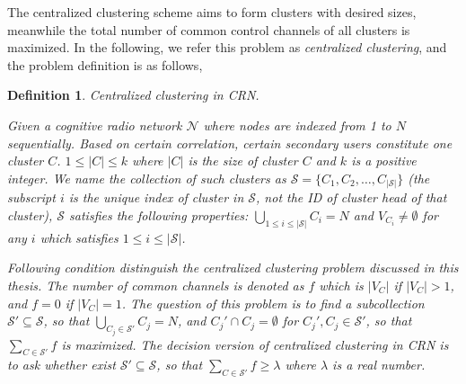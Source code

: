 \documentclass[10pt,journal,compsoc]{IEEEtran}
\theoremstyle{mytheoremstyle}
\theoremstyle{mytheoremstyle}
\theoremstyle{mytheoremstyle}
\newtheorem{mydef}{Definition}%
\begin{document}


The centralized clustering scheme aims to form clusters with desired sizes, meanwhile the total number of common control channels of all clusters is maximized.
In the following, we refer this problem as \textit{centralized clustering}, and the problem definition is as follows, 


\begin{mydef}
\label{def_centralized_clustering}
\textit{Centralized clustering in CRN.}

Given a cognitive radio network $\mathcal{N}$ where nodes are indexed from 1 to $N$ sequentially.
Based on certain correlation, certain secondary users constitute one cluster $C$.
$1\leq |C| \leqslant k$ where $|C|$ is the size of cluster $C$ and $k$ is a positive integer.
We name the collection of such clusters as $\mathcal{S}=\{C_1, C_2,\ldots,C_{|\mathcal{S}|}\}$ (the subscript $i$ is the unique index of cluster in $\mathcal{S}$, not the ID of cluster head of that cluster), $\mathcal{S}$ satisfies the following properties: $\bigcup_{1\leq i \leq |\mathcal{S}|} C_i = N$ and $V_{C_i}\neq \emptyset$ for any $i$ which satisfies $1\leq i \leq |\mathcal{S}|$.

Following condition distinguish the centralized clustering problem discussed in this thesis.
The number of common channels is denoted as $f$ which is $|V_{C}|$ if $|V_{C}|>1$, and $f=0$ if $|V_{C}|=1$.
The question of this problem is to find a subcollection $\mathcal{S}' \subseteq \mathcal{S}$, so that $\bigcup_{C_j\in \mathcal{S}'} C_j = N$, and $C_j'\cap C_j =\emptyset$ for $C_j', C_j\in \mathcal{S}'$, so that $\sum_{C\in \mathcal{S}'} f$ is maximized.
The decision version of centralized clustering in CRN is to ask whether exist $\mathcal{S}'\subseteq \mathcal{S}$, so that $\sum_{C\in \mathcal{S}'} f \geqslant \lambda$ where $\lambda$ is a real number.%
\end{mydef}


\end{document}
